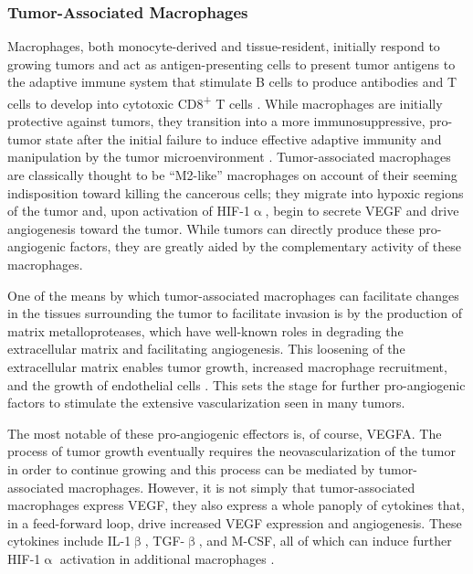 \subsubsection{Tumor\hyp{}Associated Macrophages}\label{tams}

Macrophages, both monocyte\hyp{}derived and tissue\hyp{}resident, initially respond to growing tumors and act as antigen\hyp{}presenting cells to present tumor antigens to the adaptive immune system that stimulate B cells to produce antibodies and T cells to develop into cytotoxic CD8\textsuperscript{+} T cells \citep{Laviron2019}. While macrophages are initially protective against tumors, they transition into a more immunosuppressive, pro\hyp{}tumor state after the initial failure to induce effective adaptive immunity and manipulation by the tumor microenvironment \citep{Noy2014}. Tumor\hyp{}associated macrophages are classically thought to be ``M2\hyp{}like'' macrophages on account of their seeming indisposition toward killing the cancerous cells; they migrate into hypoxic regions of the tumor and, upon activation of HIF\hyp{}1$\upalpha$, begin to secrete VEGF and drive angiogenesis toward the tumor. While tumors can directly produce these pro\hyp{}angiogenic factors, they are greatly aided by the complementary activity of these macrophages.

One of the means by which tumor\hyp{}associated macrophages can facilitate changes in the tissues surrounding the tumor to facilitate invasion is by the production of matrix metalloproteases, which have well\hyp{}known roles in degrading the extracellular matrix and facilitating angiogenesis. This loosening of the extracellular matrix enables tumor growth, increased macrophage recruitment, and the growth of endothelial cells \citep{Lamagna2006}. This sets the stage for further pro\hyp{}angiogenic factors to stimulate the extensive vascularization seen in many tumors.

The most notable of these pro\hyp{}angiogenic effectors is, of course, VEGFA. The process of tumor growth eventually requires the neovascularization of the tumor in order to continue growing and this process can be mediated by tumor\hyp{}associated macrophages. However, it is not simply that tumor\hyp{}associated macrophages express VEGF, they also express a whole panoply of cytokines that, in a feed\hyp{}forward loop, drive increased VEGF expression and angiogenesis. These cytokines include IL\hyp{}1$\upbeta$, TGF\hyp{}$\upbeta$, and M\hyp{}CSF, all of which can induce further HIF\hyp{}1$\upalpha$ activation in additional macrophages \citep{Nicholas2010, Guo2016}.

